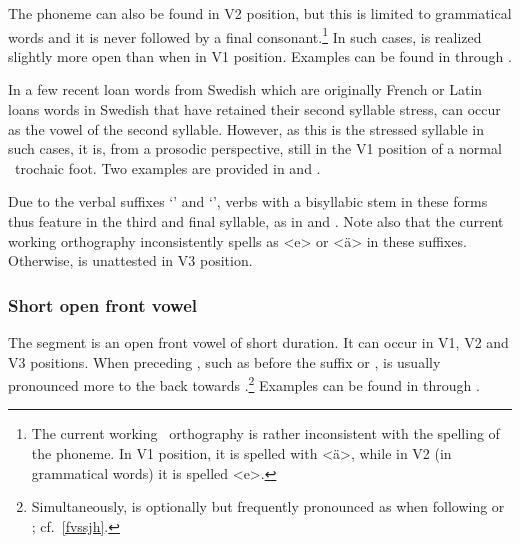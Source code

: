 The phoneme  can also be found in V2 position, but this is limited to grammatical words and it is never followed by a final consonant.\footnote{The current working \PS\ orthography is rather inconsistent with the spelling of the  phoneme. In V1 position, it is spelled with <ä>, while in V2 (in grammatical words) it is spelled <e>.} %
In such cases,  is realized slightly more open than when in V1 position. Examples can be found in  through .

In a few recent loan words from Swedish which are originally French or Latin loans words in Swedish that have retained their second syllable stress,  can occur as the vowel of the second syllable. However, as this is the stressed syllable in such cases, it is, from a prosodic perspective, still in the V1 position of a normal \PS\ trochaic foot. Two examples are provided in  and .

Due to the verbal suffixes  ‘’ and  ‘’, verbs with a bisyllabic stem in these forms thus feature  in the third and final syllable, as in  and . 
Note also that the current working orthography inconsistently spells  as <e> or <ä> in these suffixes. 
Otherwise,  is unattested in V3 position.



\subsubsection{Short open front vowel}
The segment  is an open front vowel of short duration. It can occur in V1, V2 and V3 positions. When preceding , such as before the suffix   or  ,  is usually pronounced more to the back towards \ipa{[ɑ]}.\footnote{Simultaneously,  is optionally but frequently pronounced as \ipa{[ʋ]} when following  or ; cf.~\SEC\ref{fvssjh}.} 
Examples can be found in  through .

